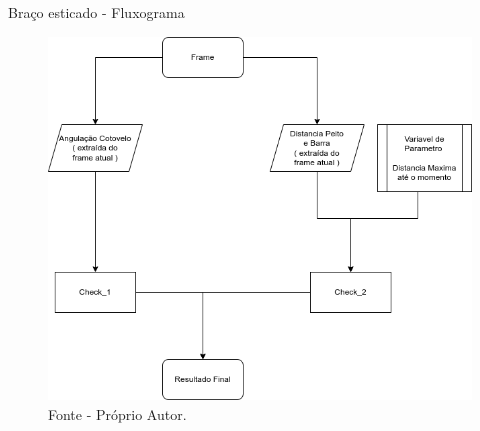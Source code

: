 \begin{frame}{Braço esticado - Fluxograma}
    \begin{figure}[!ht]
        \centering
            \includegraphics[scale=0.35]{img/desenvolvimento/bracoEsticado/fluxograma.png}
        \caption*{Fonte - Próprio Autor.}
    \end{figure}
\end{frame}


